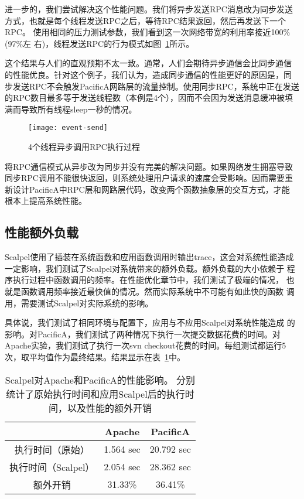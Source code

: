 进一步的，我们尝试解决这个性能问题。我们将异步发送RPC消息改为同步发送
方式，也就是每个线程发送RPC之后，等待RPC结果返回，然后再发送下一个RPC。
使用相同的压力测试参数，我们看到这一次网络带宽的利用率接近100\%(97\%左
右)，线程发送RPC的行为模式如图~\ref{fig:event-send}所示。

这个结果与人们的直观预期不太一致。通常，人们会期待异步通信会比同步通信
的性能优良。针对这个例子，我们认为，造成同步通信的性能更好的原因是，同
步发送RPC不会触发PacificA网路层的流量控制。使用同步RPC，系统中正在发送
的RPC数目最多等于发送线程数（本例是4个），因而不会因为发送消息缓冲被填
满而导致所有线程sleep一秒的情况。

\begin{figure}
  \centering
  \begin{minipage}{0.8\linewidth}
    \centering
    \texttt{[image: event-send]}
    \caption{4个线程异步调用RPC执行过程}
    \label{fig:event-send}
  \end{minipage}
\end{figure}

将RPC通信模式从异步改为同步并没有完美的解决问题。如果网络发生拥塞导致
同步RPC调用不能很快返回，则系统处理用户请求的速度会受影响。因而需要重
新设计PacificA中RPC层和网路层代码，改变两个函数抽象层的交互方式，才能
根本上提高系统性能。


\subsection{性能额外负载}
\label{sec:scp:perf}

Scalpel使用了插装在系统函数和应用函数调用时输出trace，这会对系统性能造成
一定影响，我们测试了Scalpel对系统带来的额外负载。额外负载的大小依赖于
程序执行过程中函数调用的频率。在性能优化章节中，我们测试了极端的情况，
也就是函数调用频率接近最快值的情况。然而实际系统中不可能有如此快的函数
调用，需要测试Scalpel对实际系统的影响。

具体说，我们测试了相同环境与配置下，应用与不应用Scalpel对系统性能造成
的影响。对PacificA，我们测试了两种情况下执行一次提交数据花费的时间。对
Apache实验，我们测试了执行一次svn checkout花费的时间。每组测试都运行5
次，取平均值作为最终结果。结果显示在表~\ref{fig:perf}中。

\begin{table}[t!]
\small
\centering
\begin{minipage}{0.8\linewidth}
\centering
\caption{Scalpel对Apache和PacificA的性能影响。
分别统计了原始执行时间和应用Scalpel后的执行时间，以及性能的额外开销}
\label{fig:perf}
\begin{tabular}{ccc}

\toprule[1.5pt]
  		& Apache	& PacificA \\
\midrule[1pt]
执行时间（原始）& 1.564 sec	& 20.792 sec \\
执行时间（Scalpel）& 2.054 sec	& 28.362 sec \\
额外开销	& 31.33\%       & 36.41\% \\
\bottomrule[1.5pt]
\end{tabular}
\end{minipage}
\end{table}

